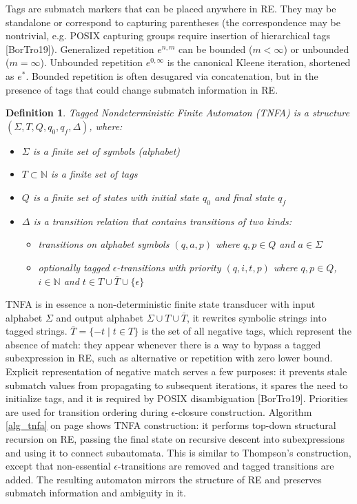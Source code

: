 \documentclass[]{article}
\newtheorem{definition}{Definition}
\newcommand*{\Xbar}[1]{\overline{#1}}
\newcommand{\YN}{\mathbb{N}}
\begin{document}
Tags are submatch markers that can be placed anywhere in RE.
They may be standalone or correspond to capturing parentheses
(the correspondence may be nontrivial, e.g. POSIX capturing groups require insertion of hierarchical tags [BorTro19]).
Generalized repetition $e^{n, m}$ can be bounded ($m < \infty$) or unbounded ($m = \infty$).
Unbounded repetition $e^{0,\infty}$ is the canonical Kleene iteration, shortened as $e^*$.
Bounded repetition is often desugared via concatenation, but in the presence of tags that could change submatch information in RE.

\begin{definition} \label{def_tnfa}
Tagged Nondeterministic Finite Automaton (TNFA)
is a structure $(\Sigma, T, Q, q_0, q_f, \Delta)$, where:
\begin{itemize}
    \item[] $\Sigma$ is a finite set of symbols (alphabet)
    \item[] $T \subset \YN$ is a finite set of tags
    \item[] $Q$ is a finite set of states with initial state $q_0$ and final state $q_f$
    \item[] $\Delta$ is a transition relation that contains transitions of two kinds:
    \begin{itemize}
        \item[] transitions on alphabet symbols $(q, a, p)$ where $q, p \in Q$ and $a \in \Sigma$
        \item[] optionally tagged $\epsilon$-transitions with priority $(q, i, t, p)$ where $q, p \in Q$, $i \in \YN$ and $t \in T \cup \Xbar{T} \cup \{\epsilon\}$
    \end{itemize}
\end{itemize}
\end{definition}

TNFA is in essence a non-deterministic finite state transducer with input alphabet $\Sigma$ and output alphabet $\Sigma \cup T \cup \Xbar{T}$, it rewrites symbolic strings into tagged strings.
$\Xbar{T} = \{-t \mid t \in T\}$ is the set of all negative tags, which represent the absence of match: they appear whenever there is a way to bypass a tagged subexpression in RE,
such as alternative or repetition with zero lower bound.
Explicit representation of negative match serves a few purposes:
it prevents stale submatch values from propagating to subsequent iterations,
it spares the need to initialize tags,
and it is required by POSIX disambiguation [BorTro19].
Priorities are used for transition ordering during $\epsilon$-closure construction.
%
Algorithm \ref{alg_tnfa} on page \pageref{alg_tnfa} shows TNFA construction:
it performs top-down structural recursion on RE, passing the final state on recursive descent into subexpressions
and using it to connect subautomata.
This is similar to Thompson's construction, except that non-essential $\epsilon$-transitions are removed and tagged transitions are added.
The resulting automaton mirrors the structure of RE and preserves submatch information and ambiguity in it.
\end{document}
